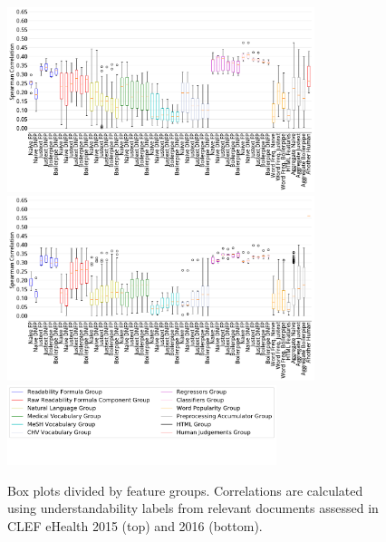 \begin{figure}[h!]
   \centering
   \includegraphics[width=0.80\textwidth]{graphics/box_spearman15_raw_values}
   \includegraphics[width=0.80\textwidth]{graphics/box_spearman16_raw_values}
   \includegraphics[width=0.7\textwidth]{graphics/legendCorr}
   \vspace{-1cm}
   \caption{Box plots divided by feature groups. Correlations are calculated using understandability labels from relevant documents assessed in CLEF eHealth 2015 (top) and 2016 (bottom).}
   \label{fig:boxplot_corr_docs}
\end{figure}

%

